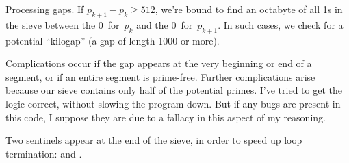 Processing gaps.
If $p_{k+1}-p_k\ge512$, we're bound to find an octabyte of all 1s in the
sieve between the 0~for~$p_k$ and the 0~for~$p_{k+1}$. In such cases,
we check for a potential ``kilogap'' (a gap of length 1000 or more).

Complications occur if the gap appears at the very beginning or end of
a segment, or if an entire segment is prime-free. Further complications
arise because our sieve contains only half of the potential primes.
I've tried to get the logic correct, without slowing the program down.
But if any bugs are present in this code, I suppose they are due to a fallacy
in this aspect of my reasoning.

Two sentinels appear at the end of the sieve, in order to speed up
loop termination:  and .

